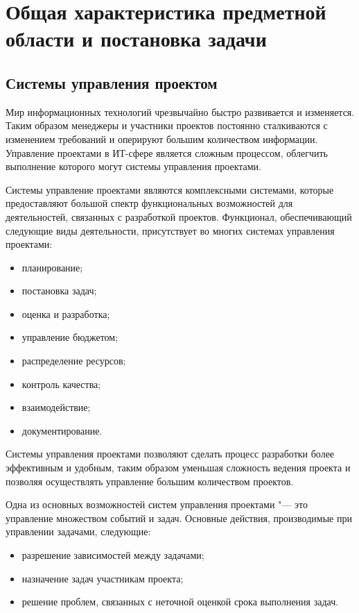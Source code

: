 \chapter{Общая характеристика предметной области и постановка задачи}
\section{Системы управления проектом}

Мир информационных технологий чрезвычайно быстро развивается и изменяется.
Таким образом менеджеры и участники проектов постоянно сталкиваются с изменением
требований и оперируют большим количеством информации. Управление проектами в
ИТ-сфере является сложным процессом, облегчить выполнение которого могут системы
управления проектами.

Системы управление проектами являются комплексными системами, которые
предоставляют большой спектр функциональных возможностей для деятельностей,
связанных с разработкой проектов. Функционал, обеспечивающий следующие виды
деятельности, присутствует во многих системах управления проектами:
\begin{itemize}
  \item планирование;
  \item постановка задач;
  \item оценка и разработка;
  \item управление бюджетом;
  \item распределение ресурсов;
  \item контроль качества;
  \item взаимодействие;
  \item документирование.
\end{itemize}
Системы управления проектами позволяют сделать процесс разработки более
эффективным и удобным, таким образом уменьшая сложность ведения проекта и
позволяя осуществлять управление большим количеством проектов. 

Одна из основных возможностей систем управления проектами "--- это
управление множеством событий и задач. Основные действия, производимые
при управлении задачами, следующие:
\begin{itemize}
  \item разрешение зависимостей между задачами;
  \item назначение задач участникам проекта;
  \item решение проблем, связанных с неточной оценкой срока выполнения задач.
\end{itemize}


